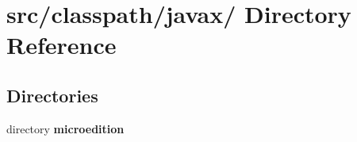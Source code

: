 \section{src/classpath/javax/ Directory Reference}
\label{dir_8048c5031abb1f29135d6bfbe1b523e5}
\subsection*{Directories}
\begin{DoxyCompactItemize}
\item 
directory {\bf microedition}
\end{DoxyCompactItemize}

